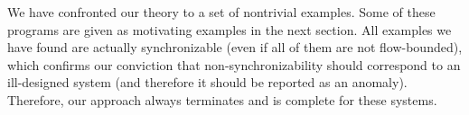 We have confronted our theory to a set of nontrivial examples. Some of these programs are given as motivating examples in the next section. 
All examples we have found are actually synchronizable (even if all of them are not flow-bounded), which confirms our conviction that non-synchronizability should correspond to an ill-designed system (and therefore it should be reported as an anomaly). Therefore, our approach always terminates and is complete for these systems.


%
%
%
%
%
%
